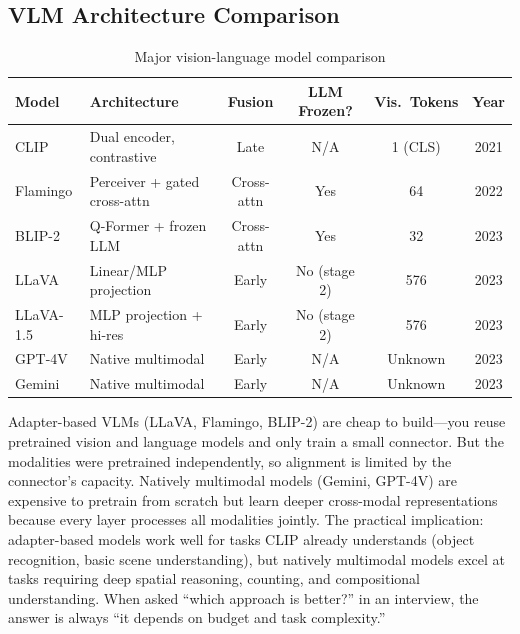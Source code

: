 \subsection{VLM Architecture Comparison}

\begin{table}[H]
\centering
\caption{Major vision-language model comparison}
\begin{tabularx}{\textwidth}{lXcccc}
\toprule
\textbf{Model} & \textbf{Architecture} & \textbf{Fusion} & \textbf{LLM Frozen?} & \textbf{Vis.\ Tokens} & \textbf{Year} \\
\midrule
CLIP & Dual encoder, contrastive & Late & N/A & 1 (CLS) & 2021 \\
Flamingo & Perceiver + gated cross-attn & Cross-attn & Yes & 64 & 2022 \\
BLIP-2 & Q-Former + frozen LLM & Cross-attn & Yes & 32 & 2023 \\
LLaVA & Linear/MLP projection & Early & No (stage 2) & 576 & 2023 \\
LLaVA-1.5 & MLP projection + hi-res & Early & No (stage 2) & 576 & 2023 \\
GPT-4V & Native multimodal & Early & N/A & Unknown & 2023 \\
Gemini & Native multimodal & Early & N/A & Unknown & 2023 \\
\bottomrule
\end{tabularx}
\end{table}

\begin{keyinsight}
Adapter-based VLMs (LLaVA, Flamingo, BLIP-2) are cheap to build---you reuse pretrained vision and language models and only train a small connector. But the modalities were pretrained independently, so alignment is limited by the connector's capacity. Natively multimodal models (Gemini, GPT-4V) are expensive to pretrain from scratch but learn deeper cross-modal representations because every layer processes all modalities jointly. The practical implication: adapter-based models work well for tasks CLIP already understands (object recognition, basic scene understanding), but natively multimodal models excel at tasks requiring deep spatial reasoning, counting, and compositional understanding. When asked ``which approach is better?'' in an interview, the answer is always ``it depends on budget and task complexity.''
\end{keyinsight}

